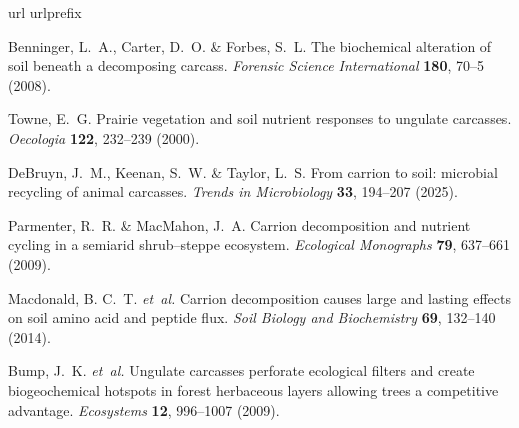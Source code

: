 \documentclass[
  sn-nature,
  lineno, referee]{sn-jnl}
\begin{document}
\begin{thebibliography}{10}
  \expandafter\ifx\csname url\endcsname\relax
    \def\url#1{\burl{#1}}\fi
  \expandafter\ifx\csname urlprefix\endcsname\relax\def\urlprefix{URL }\fi
  \providecommand{\bibinfo}[2]{#2}
  \providecommand{\eprint}[2][]{\url{#2}}
  \providecommand{\doi}[1]{\url{https://doi.org/#1}}
  \bibcommenthead
  
  \bibinfo{author}{Benninger, L.~A.}, \bibinfo{author}{Carter, D.~O.} \& \bibinfo{author}{Forbes, S.~L.}
  \newblock \bibinfo{title}{The biochemical alteration of soil beneath a decomposing carcass}.
  \newblock \emph{\bibinfo{journal}{Forensic Science International}} \textbf{\bibinfo{volume}{180}}, \bibinfo{pages}{70--5} (\bibinfo{year}{2008}).
  
  \bibinfo{author}{Towne, E.~G.}
  \newblock \bibinfo{title}{Prairie vegetation and soil nutrient responses to ungulate carcasses}.
  \newblock \emph{\bibinfo{journal}{Oecologia}} \textbf{\bibinfo{volume}{122}}, \bibinfo{pages}{232--239} (\bibinfo{year}{2000}).
  
  \bibinfo{author}{DeBruyn, J.~M.}, \bibinfo{author}{Keenan, S.~W.} \& \bibinfo{author}{Taylor, L.~S.}
  \newblock \bibinfo{title}{From carrion to soil: microbial recycling of animal carcasses}.
  \newblock \emph{\bibinfo{journal}{Trends in Microbiology}} \textbf{\bibinfo{volume}{33}}, \bibinfo{pages}{194--207} (\bibinfo{year}{2025}).
  
  \bibinfo{author}{Parmenter, R.~R.} \& \bibinfo{author}{MacMahon, J.~A.}
  \newblock \bibinfo{title}{Carrion decomposition and nutrient cycling in a semiarid shrub–steppe ecosystem}.
  \newblock \emph{\bibinfo{journal}{Ecological Monographs}} \textbf{\bibinfo{volume}{79}}, \bibinfo{pages}{637--661} (\bibinfo{year}{2009}).
  
  \bibinfo{author}{Macdonald, B. C.~T.} \emph{et~al.}
  \newblock \bibinfo{title}{Carrion decomposition causes large and lasting effects on soil amino acid and peptide flux}.
  \newblock \emph{\bibinfo{journal}{Soil Biology and Biochemistry}} \textbf{\bibinfo{volume}{69}}, \bibinfo{pages}{132--140} (\bibinfo{year}{2014}).
  
  \bibinfo{author}{Bump, J.~K.} \emph{et~al.}
  \newblock \bibinfo{title}{Ungulate carcasses perforate ecological filters and create biogeochemical hotspots in forest herbaceous layers allowing trees a competitive advantage}.
  \newblock \emph{\bibinfo{journal}{Ecosystems}} \textbf{\bibinfo{volume}{12}}, \bibinfo{pages}{996--1007} (\bibinfo{year}{2009}).
  

\end{thebibliography}
\end{document}
